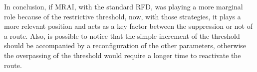 In conclusion, if \ac{MRAI}, with the standard \ac{RFD}, was playing a more
marginal role because of the restrictive threshold, now, with those strategies,
it plays a more relevant position and acts as a key factor between the suppression
or not of a route.
Also, is possible to notice that the simple increment of the threshold should be
accompanied by a reconfiguration of the other parameters, otherwise the overpassing
of the threshold would require a longer time to reactivate the route.



